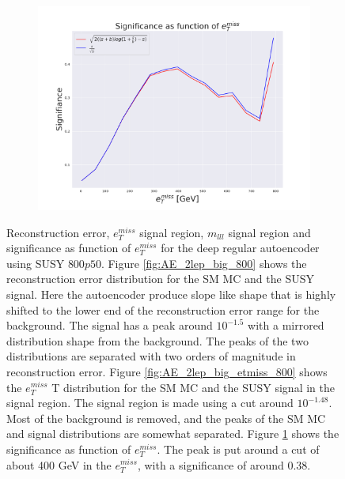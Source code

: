 \begin{figure}[H]
    \begin{subfigure}{.50\textwidth}
        \includegraphics[width=\textwidth]{Figures/AE_testing/big/2lep/significance_etmiss_800p0p050_-1.4833711230716062.pdf}
        \caption{}
        \label{fig:AE_2lep_big_signi_800}
    \end{subfigure}
    \hfill      
    \caption[2lep deep network | $800p50$ | AE]{Reconstruction error, $e_T^{miss}$ signal region, $m_{lll}$ signal region and significance as function of 
    $e_T^{miss}$ for the deep regular autoencoder using SUSY $800p50$. 
    Figure \ref{fig:AE_2lep_big_800} shows the reconstruction error distribution for the SM MC and the SUSY signal. 
Here the autoencoder produce slope like shape that is highly shifted to the lower end of the reconstruction error range
for the background. The signal has a peak around $10^{-1.5}$ with a mirrored distribution shape from the background. The peaks of the two distributions are separated
with two orders of magnitude in reconstruction error. Figure \ref{fig:AE_2lep_big_etmiss_800} shows the $e_T^{miss}$
T distribution for the SM MC and the SUSY signal in the signal region. The signal region is made using a cut around
$10^{-1.48}$. Most of the background is removed, and the peaks of the SM MC and signal distributions are
somewhat separated.  Figure \ref{fig:AE_2lep_big_signi_800} shows the significance as function of $e_T^{miss}$. The peak is put 
around a cut of about 400 GeV in the $e_T^{miss}$, with a significance of around $0.38$.}
    \label{fig:AE_2lep_big_rec_sig_signi_800}
\end{figure}

